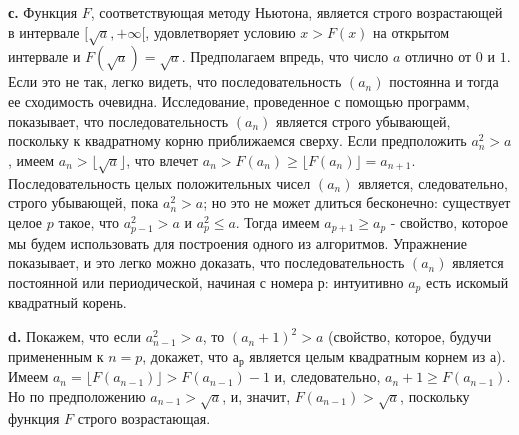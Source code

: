 \textbf{с.} Функция $F$, соответствующая методу Ньютона, является строго возрастающей в интервале $[\sqrt{a}, + \infty [$, удовлетворяет условию $x > F(x)$ на открытом интервале и $F(\sqrt{a}) = \sqrt{a}$. Предполагаем впредь, что число $a$ отлично от $0$ и $1$. Если это не так, легко видеть, что последовательность $(a_{n})$ постоянна и тогда ее сходимость очевидна. Исследование, проведенное с помощью программ, показывает, что последовательность $(a_{n})$ является строго убывающей, поскольку к квадратному корню приближаемся сверху. Если предположить $a_{n}^{2} > a$, имеем $a_{n} > \lfloor \sqrt{a} \rfloor$, что влечет $a_{n} > F(a_{n}) \geqslant \lfloor F(a_{n}) \rfloor = a_{n+1}$. 
Последовательность целых положительных чисел $(a_{n})$ является, следовательно, строго убывающей, пока $a_{n}^{2} > a$; но это не может длиться бесконечно: существует целое $p$ такое, что $a^{2}_{p-1} > a$ и $a^{2}_{p} \leqslant a$. Тогда имеем $a_{p+1} \geqslant a_{p}$ - свойство, которое мы будем использовать для построения одного из алгоритмов. Упражнение показывает, и это легко можно доказать, что последовательность $(a_{n})$ является постоянной или периодической, начиная с номера $р$: интуитивно $a_{p}$ есть искомый квадратный корень.
\newpage

\restoretop
{}
\textbf{d.} Покажем, что если $a^{2}_{n-1} > a$, то $(a_{n} + 1)^{2} > a$ (свойство, которое, будучи примененным к $n = p$, докажет, что $а_{р}$ является целым квадратным корнем из $а$). Имеем $a_{n} = \lfloor F(a_{n-1}) \rfloor > F(a_{n-1}) - 1$ и, следовательно, $a_{n} + 1 \geqslant F(a_{n-1})$. Но по предположению $a_{n-1} > \sqrt{a}$, и, значит, $F(a_{n-1}) > \sqrt{a}$, поскольку функция $F$ строго возрастающая.

